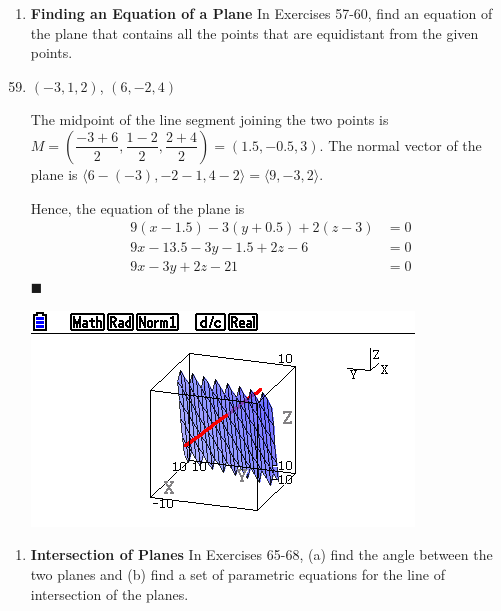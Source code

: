 \newpage
\begin{enumerate}[label={},leftmargin=*]
    \item \textbf{Finding an Equation of a Plane} In Exercises 57-60, find an equation of the plane that contains all the points that are equidistant from the given points.
\end{enumerate}

\begin{enumerate}
    \setcounter{enumi}{58}
    \item $(-3, 1, 2)$, $(6, -2, 4)$

          \sol{} The midpoint of the line segment joining the two points is $M = \left(\dfrac{-3 + 6}{2}, \dfrac{1 - 2}{2}, \dfrac{2 + 4}{2}\right) = (1.5, -0.5, 3)$. The normal vector of the plane is $\langle 6 - (-3), -2 - 1, 4 - 2 \rangle = \langle 9, -3, 2 \rangle$.

          Hence, the equation of the plane is
          \begin{align*}
              9(x - 1.5) - 3(y + 0.5) + 2(z - 3) & = 0 \\
              9x - 13.5 - 3y - 1.5 + 2z - 6      & = 0 \\
              9x - 3y + 2z - 21                  & = 0
          \end{align*} \hfill $\blacksquare$
          \begin{center}
              \includegraphics[scale=0.5]{assets/larson11.5q59graph.png}
          \end{center}
\end{enumerate}

\begin{enumerate}[label={},leftmargin=*]
    \item \textbf{Intersection of Planes} In Exercises 65-68, (a) find the angle between the two planes and (b) find a set of parametric equations for the line of intersection of the planes.
\end{enumerate}

